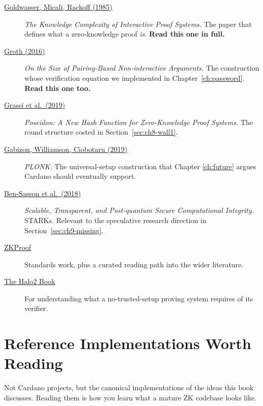 \begin{description}
  \item[\href{https://dl.acm.org/doi/10.1145/22145.22178}{Goldwasser, Micali, Rackoff (1985)}]
    \emph{The Knowledge Complexity of Interactive Proof Systems.} The paper
    that defines what a zero-knowledge proof \emph{is}.
    \textbf{Read this one in full.}

  \item[\href{https://eprint.iacr.org/2016/260}{Groth (2016)}]
    \emph{On the Size of Pairing-Based Non-interactive Arguments.} The
    construction whose verification equation we implemented in
    Chapter~\ref{ch:password}. \textbf{Read this one too.}

  \item[\href{https://eprint.iacr.org/2019/458}{Grassi et al.\ (2019)}]
    \emph{Poseidon: A New Hash Function for Zero-Knowledge Proof Systems.}
    The round structure costed in Section~\ref{sec:ch8-wall1}.

  \item[\href{https://eprint.iacr.org/2019/953}{Gabizon, Williamson, Ciobotaru (2019)}]
    \emph{PLONK.} The universal-setup construction that Chapter
    \ref{ch:future} argues Cardano should eventually support.

  \item[\href{https://eprint.iacr.org/2018/046}{Ben-Sasson et al.\ (2018)}]
    \emph{Scalable, Transparent, and Post-quantum Secure Computational
    Integrity.} STARKs. Relevant to the speculative research direction in
    Section~\ref{sec:ch9-missing}.

  \item[\href{https://zkproof.org/}{ZKProof}]
    Standards work, plus a curated reading path into the wider literature.

  \item[\href{https://zcash.github.io/halo2/}{The Halo2 Book}]
    For understanding what a no-trusted-setup proving system requires of its
    verifier.
\end{description}

\section{Reference Implementations Worth Reading} \label{sec:sito-reference}

Not Cardano projects, but the canonical implementations of the ideas this book
discusses. Reading them is how you learn what a mature ZK codebase looks like.

